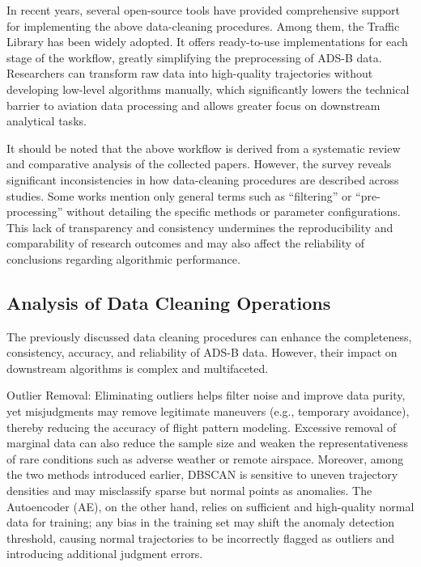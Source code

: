 In recent years, several open-source tools have provided comprehensive support for implementing the above data-cleaning procedures. Among them, the Traffic Library \cite{olive2019traffic} has been widely adopted. It offers ready-to-use implementations for each stage of the workflow, greatly simplifying the preprocessing of ADS-B data. Researchers can transform raw data into high-quality trajectories without developing low-level algorithms manually, which significantly lowers the technical barrier to aviation data processing and allows greater focus on downstream analytical tasks.

It should be noted that the above workflow is derived from a systematic review and comparative analysis of the collected papers. However, the survey reveals significant inconsistencies in how data-cleaning procedures are described across studies. Some works mention only general terms such as “filtering” or “pre-processing” without detailing the specific methods or parameter configurations. This lack of transparency and consistency undermines the reproducibility and comparability of research outcomes and may also affect the reliability of conclusions regarding algorithmic performance.

\subsection{Analysis of Data Cleaning Operations}

The previously discussed data cleaning procedures can enhance the completeness, consistency, accuracy, and reliability of ADS-B data. However, their impact on downstream algorithms is complex and multifaceted.

Outlier Removal: Eliminating outliers helps filter noise and improve data purity, yet misjudgments may remove legitimate maneuvers (e.g., temporary avoidance), thereby reducing the accuracy of flight pattern modeling. Excessive removal of marginal data can also reduce the sample size and weaken the representativeness of rare conditions such as adverse weather or remote airspace. Moreover, among the two methods introduced earlier, DBSCAN is sensitive to uneven trajectory densities and may misclassify sparse but normal points as anomalies. The Autoencoder (AE), on the other hand, relies on sufficient and high-quality normal data for training; any bias in the training set may shift the anomaly detection threshold, causing normal trajectories to be incorrectly flagged as outliers and introducing additional judgment errors.

